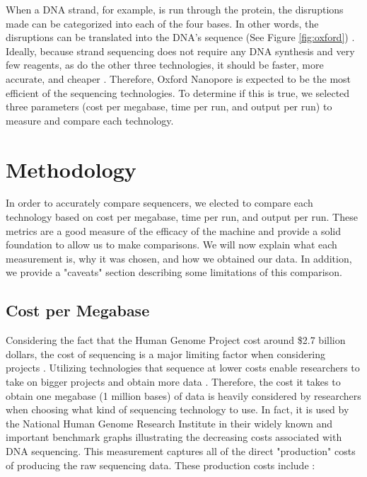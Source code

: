 \documentclass[12pt,letterpaper]{report}
\begin{document}
When a DNA strand, for example, is run through the protein, the disruptions made can be categorized into each of the four bases. In other words, the disruptions can be translated into the DNA's sequence (See Figure \ref{fig:oxford}) \cite{nanoporesite}. Ideally, because strand sequencing does not require any DNA synthesis and very few reagents, as do the other three technologies, it should be faster, more accurate, and cheaper \cite{Xuan}. Therefore, Oxford Nanopore is expected to be the most efficient of the sequencing technologies. To determine if this is true, we selected three parameters (cost per megabase, time per run, and output per run) to measure and compare each technology. 

\section{Methodology}

In order to accurately compare sequencers, we elected to compare each technology based on cost per megabase, time per run, and output per run. These metrics are a good measure of the efficacy of the machine and provide a solid foundation to allow us to make comparisons. We will now explain what each measurement is, why it was chosen, and how we obtained our data. In addition, we provide a "caveats" section describing some limitations of this comparison.

\subsection{Cost per Megabase}

Considering the fact that the Human Genome Project cost around \$2.7 billion dollars, the cost of sequencing is a major limiting factor when considering projects \cite{Salto-Tellez}. Utilizing technologies that sequence at lower costs enable researchers to take on bigger projects and obtain more data \cite{Shendure}. Therefore, the cost it takes to obtain one megabase (1 million bases) of data is heavily considered by researchers when choosing what kind of sequencing technology to use. In fact, it is used by the National Human Genome Research Institute in their widely known and important benchmark graphs illustrating the decreasing costs associated with DNA sequencing. This measurement captures all of the direct "production" costs of producing the raw sequencing data. These production costs include \cite{nhgriseqcosts}:
\end{document}

